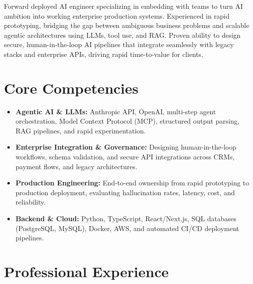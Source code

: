 \documentclass[11pt,a4paper,sans]{moderncv}
\begin{document}
\makecvtitle

Forward deployed AI engineer specializing in embedding with teams to turn AI ambition into working enterprise production systems. Experienced in rapid prototyping, bridging the gap between ambiguous business problems and scalable agentic architectures using LLMs, tool use, and RAG. Proven ability to design secure, human-in-the-loop AI pipelines that integrate seamlessly with legacy stacks and enterprise APIs, driving rapid time-to-value for clients.

\section{Core Competencies}
\begin{itemize}
\item \textbf{Agentic AI \& LLMs:} Anthropic API, OpenAI, multi-step agent orchestration, Model Context Protocol (MCP), structured output parsing, RAG pipelines, and rapid experimentation.
\item \textbf{Enterprise Integration \& Governance:} Designing human-in-the-loop workflows, schema validation, and secure API integrations across CRMs, payment flows, and legacy architectures.
\item \textbf{Production Engineering:} End-to-end ownership from rapid prototyping to production deployment, evaluating hallucination rates, latency, cost, and reliability.
\item \textbf{Backend \& Cloud:} Python, TypeScript, React/Next.js, SQL databases (PostgreSQL, MySQL), Docker, AWS, and automated CI/CD deployment pipelines.
\end{itemize}

\section{Professional Experience}
\end{document}
